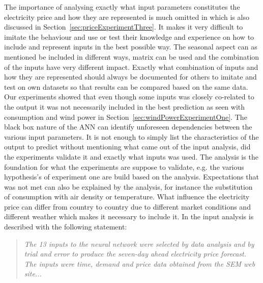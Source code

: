 The importance of analysing exactly what input parameters constitutes the electricity price and how they are represented is much omitted in\cite{ShortTermWindPowerForecasting,szkuta1999electricity,sansom1999neural} which is also discussed in Section~\ref{sec:priceExperimentThree}. It makes it very difficult to imitate the behaviour and use or test their knowledge and experience on how to include and represent inputs in the best possible way. The seasonal aspect can as mentioned be included in different ways, matrix can be used and the combination of the inputs have very different impact. Exactly what combination of inputs and how they are represented should always be documented for others to imitate and test on own datasets so that results can be compared based on the same data. Our experiments showed that even though some inputs was closely co-related to the output it was not necessarily included in the best prediction as seen with consumption and wind power in Section~\ref{sec:windPowerExperimentOne}. The black box nature of the ANN can identify unforeseen dependencies between the various input parameters. It is not enough to simply list the characteristics of the output to predict without mentioning what came out of the input analysis, did the experiments validate it and exactly what inputs was used. The analysis is the foundation for what the experiments are suppose to validate, e.g. the various hypothesis's of experiment one are build based on the analysis. Expectations that was not met can also be explained by the analysis, for instance the substitution of consumption with air density or temperature. What influence the electricity price can differ from country to country due to different market conditions and different weather which makes it necessary to include it. In \cite{sansom1999neural} the input analysis is described with the following statement:

\begin{quotation}
\textit{The 13 inputs to the neural network were selected by data analysis and by trial and error to produce the seven-day ahead electricity price forecast. The inputs were time, demand and price data obtained from the SEM web site...}
\end{quotation}

